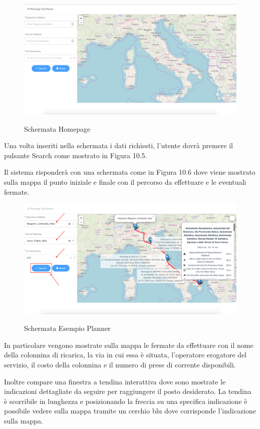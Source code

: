 \begin{figure}[h]
\centering
{\includegraphics[scale=0.3]{Immagini/Schermata_Homepage.png}}
\caption{Schermata Homepage}
\end{figure}

Una volta inseriti nella schermata i dati 
richiesti, l'utente dovrà premere il pulsante Search come mostrato in Figura 10.5.

Il sistema risponderà con una schermata come in Figura 10.6 dove viene mostrato sulla mappa il punto iniziale e finale con il percorso da effettuare e le eventuali fermate.

\begin{figure}[h]
\centering
{\includegraphics[scale=0.3]{Immagini/Schermata_esempio_planner_2.png}}
\caption{Schermata Esempio Planner}
\end{figure}
\newpage
In particolare vengono mostrate sulla mappa le fermate da effettuare con il nome della colonnina di ricarica, la via in cui essa è situata, l'operatore erogatore del servizio, il costo della colonnina e il numero di prese di corrente disponibili.

Inoltre compare una finestra a tendina interattiva dove sono mostrate le indicazioni dettagliate da seguire per raggiungere il posto desiderato.
La tendina è scorribile in lunghezza e posizionando la freccia su una specifica indicazione è possibile vedere sulla mappa tramite un cerchio blu dove corrisponde l'indicazione sulla mappa.

